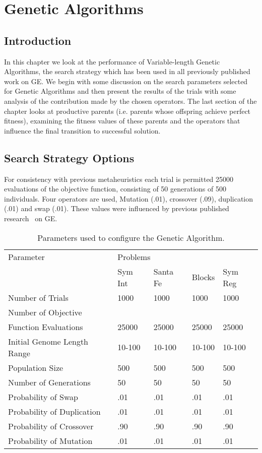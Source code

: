 \chapter{Genetic Algorithms}
\section{Introduction}
In this chapter we look at the performance of Variable-length Genetic Algorithms, the search strategy which has been used in all previously published work on GE. We begin with some discussion on the search parameters selected for Genetic Algorithms and then present the results of the trials with some analysis of the contribution made by the chosen operators. The last section of the chapter looks at productive parents (i.e. parents whose offspring achieve perfect fitness), examining the fitness values of these parents and the operators that influence the final transition to successful solution.


\section{Search Strategy Options}
For consistency with previous  metaheuristics each trial is permitted 25000 evaluations of the objective function, consisting of 50 generations of 500 individuals.  Four operators are used, Mutation (.01), crossover (.09), duplication (.01) and swap (.01). These values were influenced by previous published research~\cite{ieee2001} on GE.  


\begin{table}[h]
\begin{center}
\begin{tabular}{|l|l|l|l|l|}
\hline
Parameter &\multicolumn{4}{l|}{Problems}\\
\cline{2-1} \cline{3-1} \cline{4-1} \cline{5-1} 
 & Sym Int & Santa Fe & Blocks & Sym Reg  \\
\hline
Number of Trials & 1000 & 1000 & 1000 & 1000 \\
Number of Objective & & & & \\ 
Function Evaluations  & 25000 & 25000 & 25000 & 25000  \\
Initial Genome Length Range & 10-100 & 10-100 & 10-100 & 10-100  \\
Population Size  & 500 & 500 & 500 & 500  \\
Number of Generations  & 50 & 50 & 50 & 50  \\
Probability of Swap  & .01  & .01  & .01 & .01   \\
Probability of Duplication   & .01  & .01  & .01 & .01  \\
Probability of Crossover & .90  & .90  & .90 & .90  \\
Probability of Mutation & .01  & .01  & .01 & .01  \\
\hline
\end{tabular}
\caption{\label{ga_param_table} Parameters used to configure the Genetic Algorithm.}
\end{center}
\end{table}


